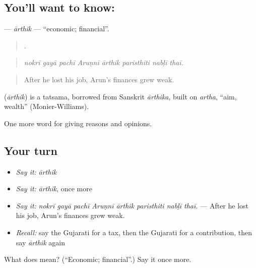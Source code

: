 \subsection*{You'll want to know: }
\textbf{} — \emph{ārthik} — \textquotedblleft{}economic; financial\textquotedblright{}.

\begin{quote}
       .
\end{quote}

\begin{quote}
\emph{nokrī gayā pachī Aruṇnī ārthik paristhiti nabḷī thaī.}
\end{quote}

\begin{quote}
After he lost his job, Arun's finances grew weak.
\end{quote}

\begin{cousinweb}
\textbf{} (\emph{ārthik}) is a tatsama, borrowed from Sanskrit \emph{ārthika}, built on \emph{artha}, \textquotedblleft{}aim, wealth\textquotedblright{} (Monier-Williams).
\end{cousinweb}

\begin{grammarlens}[title={What you've built}]
One more word for giving reasons and opinions.
\end{grammarlens}

\subsection*{Your turn}
\begin{itemize}
\raggedright
  \item \emph{Say it:} \emph{ārthik}
  \item \emph{Say it:} \emph{ārthik}, once more
  \item \emph{Say it:} \emph{nokrī gayā pachī Aruṇnī ārthik paristhiti nabḷī thaī.} — After he lost his job, Arun's finances grew weak.
  \item \emph{Recall:} say the Gujarati for a tax, then the Gujarati for a contribution, then say \emph{ārthik} again
\end{itemize}

\begin{tcolorbox}[breakable,colback=teal!4,colframe=teal!35!black,title={Before you move on}]
What does  mean? (\textquotedblleft{}Economic; financial\textquotedblright{}.) Say it once more.
\end{tcolorbox}
